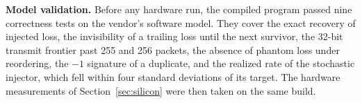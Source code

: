 \textbf{Model validation.} Before any hardware run, the compiled program passed nine correctness tests on the vendor's software model. They cover the exact recovery of injected loss, the invisibility of a trailing loss until the next survivor, the 32-bit transmit frontier past 255 and 256 packets, the absence of phantom loss under reordering, the $-1$ signature of a duplicate, and the realized rate of the stochastic injector, which fell within four standard deviations of its target. The hardware measurements of Section~\ref{sec:silicon} were then taken on the same build.
